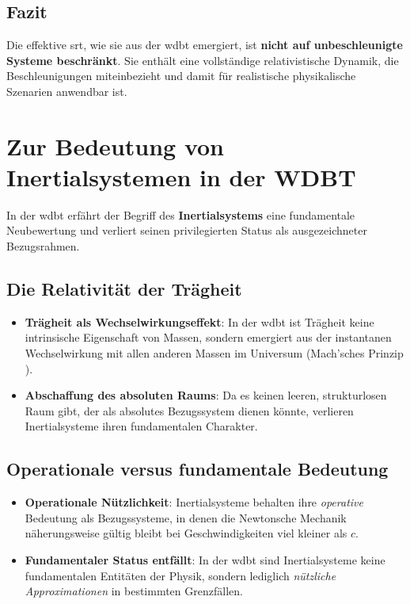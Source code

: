 \subsection{Fazit}
Die effektive \gls{srt}, wie sie aus der \gls{wdbt} emergiert, ist \textbf{nicht auf unbeschleunigte Systeme beschränkt}. Sie enthält eine vollständige relativistische Dynamik, die Beschleunigungen miteinbezieht und damit für realistische physikalische Szenarien anwendbar ist.

\section{Zur Bedeutung von Inertialsystemen in der WDBT}

In der \gls{wdbt} erfährt der Begriff des \textbf{Inertialsystems} eine fundamentale Neubewertung und verliert seinen privilegierten Status als ausgezeichneter Bezugsrahmen.

\subsection{Die Relativität der Trägheit}

\begin{itemize}
    \item \textbf{Trägheit als Wechselwirkungseffekt}: In der \gls{wdbt} ist Trägheit keine intrinsische Eigenschaft von Massen, sondern emergiert aus der instantanen Wechselwirkung mit allen anderen Massen im Universum (Mach'sches Prinzip \cite{Assis1999}).
    \item \textbf{Abschaffung des absoluten Raums}: Da es keinen leeren, strukturlosen Raum gibt, der als absolutes Bezugssystem dienen könnte, verlieren Inertialsysteme ihren fundamentalen Charakter.
\end{itemize}

\subsection{Operationale versus fundamentale Bedeutung}

\begin{itemize}
    \item \textbf{Operationale Nützlichkeit}: Inertialsysteme behalten ihre \emph{operative} Bedeutung als Bezugssysteme, in denen die Newtonsche Mechanik näherungsweise gültig bleibt bei Geschwindigkeiten viel kleiner als $c$.
    \item \textbf{Fundamentaler Status entfällt}: In der \gls{wdbt} sind Inertialsysteme keine fundamentalen Entitäten der Physik, sondern lediglich \emph{nützliche Approximationen} in bestimmten Grenzfällen.
\end{itemize}

